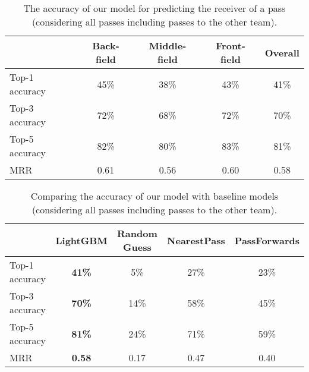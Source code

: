 \begin{table}[!t]
\caption{The accuracy of our model for predicting the receiver of a pass (considering all passes including passes to the other team).}
\centering
\renewcommand{\tabcolsep}{3pt}
\begin{tabular}{lcccc}
  \toprule
  & Back-field & Middle-field & Front-field & Overall \\
  \midrule
  Top-1 accuracy & 45\% & 38\% & 43\% & 41\% \\
  Top-3 accuracy & 72\% & 68\% & 72\% & 70\% \\
  Top-5 accuracy & 82\% & 80\% & 83\% & 81\% \\
  MRR & 0.61 & 0.56 & 0.60 & 0.58 \\
  \bottomrule
\end{tabular}
\label{tab:performance-all-passes}
\end{table}

\begin{table}[!t]
\caption{Comparing the accuracy of our model with baseline models (considering all passes including passes to the other team).}
\centering
\renewcommand{\tabcolsep}{3pt}
\begin{tabular}{lcccc}
  \toprule
  & LightGBM & Random Guess & NearestPass & PassForwards \\
  \midrule
  Top-1 accuracy & \textbf{41\%} & 5\% & 27\% & 23\% \\
  Top-3 accuracy & \textbf{70\%} & 14\% & 58\% & 45\% \\
  Top-5 accuracy & \textbf{81\%} & 24\% & 71\% & 59\% \\
  MRR & \textbf{0.58} & 0.17 & 0.47 & 0.40 \\
  \bottomrule
\end{tabular}
\label{tab:comparing-performance-all-passes}
\end{table}

